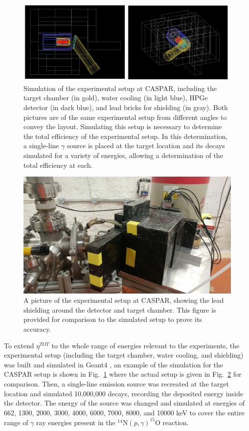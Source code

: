 \begin{figure}
\centering
\includegraphics[width=\linewidth]{figures/shieldingSimulation.png}
\caption{Simulation of the experimental setup at CASPAR, including the target chamber (in gold), water cooling (in light blue), HPGe detector (in dark blue), and lead bricks for shielding (in gray). Both pictures are of the same experimental setup from different angles to convey the layout. Simulating this setup is necessary to determine the total efficiency of the experimental setup. In this determination, a single-line $\gamma$ source is placed at the target location and its decays simulated for a variety of energies, allowing a determination of the total efficiency at each.}
\label{fig: simulatedSetup}
\end{figure}


\begin{figure}
\centering
\includegraphics[width=0.8\linewidth]{figures/shieldingPicture.jpg}
\caption{A picture of the experimental setup at CASPAR, showing the lead shielding around the detector and target chamber. This figure is provided for comparison to the simulated setup to prove its accuracy. }
\label{fig: actualSetup}
\end{figure} 

To extend $\eta^{TOT}$ to the whole range of energies relevant to the experiments, the experimental setup (including the target chamber, water cooling, and shielding) was built and simulated in Geant4 \cite{Agostinelli2003}, an example of the simulation for the CASPAR setup is shown in Fig.\ \ref{fig: simulatedSetup} where the actual setup is given in Fig.\ \ref{fig: actualSetup} for comparison. Then, a single-line emission source was recreated at the target location and simulated 10,000,000 decays, recording the deposited energy inside the detector. The energy of the source was changed and simulated at energies of 662, 1300, 2000, 3000, 4000, 6000, 7000, 8000, and 10000 keV to cover the entire range of $\gamma$ ray energies present in the $^{14}$N$\left( p,\gamma \right) ^{15}$O reaction. 

